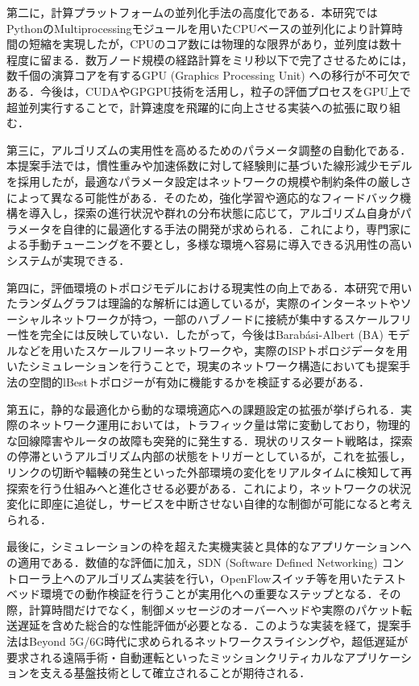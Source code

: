 第二に，計算プラットフォームの並列化手法の高度化である．本研究ではPythonのMultiprocessingモジュールを用いたCPUベースの並列化により計算時間の短縮を実現したが，CPUのコア数には物理的な限界があり，並列度は数十程度に留まる．数万ノード規模の経路計算をミリ秒以下で完了させるためには，数千個の演算コアを有するGPU (Graphics Processing Unit) への移行が不可欠である．今後は，CUDAやGPGPU技術を活用し，粒子の評価プロセスをGPU上で超並列実行することで，計算速度を飛躍的に向上させる実装への拡張に取り組む．

第三に，アルゴリズムの実用性を高めるためのパラメータ調整の自動化である．本提案手法では，慣性重みや加速係数に対して経験則に基づいた線形減少モデルを採用したが，最適なパラメータ設定はネットワークの規模や制約条件の厳しさによって異なる可能性がある．そのため，強化学習や適応的なフィードバック機構を導入し，探索の進行状況や群れの分布状態に応じて，アルゴリズム自身がパラメータを自律的に最適化する手法の開発が求められる．これにより，専門家による手動チューニングを不要とし，多様な環境へ容易に導入できる汎用性の高いシステムが実現できる．

第四に，評価環境のトポロジモデルにおける現実性の向上である．本研究で用いたランダムグラフは理論的な解析には適しているが，実際のインターネットやソーシャルネットワークが持つ，一部のハブノードに接続が集中するスケールフリー性を完全には反映していない．したがって，今後はBarabási-Albert (BA) モデルなどを用いたスケールフリーネットワークや，実際のISPトポロジデータを用いたシミュレーションを行うことで，現実のネットワーク構造においても提案手法の空間的lBestトポロジーが有効に機能するかを検証する必要がある．

第五に，静的な最適化から動的な環境適応への課題設定の拡張が挙げられる．実際のネットワーク運用においては，トラフィック量は常に変動しており，物理的な回線障害やルータの故障も突発的に発生する．現状のリスタート戦略は，探索の停滞というアルゴリズム内部の状態をトリガーとしているが，これを拡張し，リンクの切断や輻輳の発生といった外部環境の変化をリアルタイムに検知して再探索を行う仕組みへと進化させる必要がある．これにより，ネットワークの状況変化に即座に追従し，サービスを中断させない自律的な制御が可能になると考えられる．

最後に，シミュレーションの枠を超えた実機実装と具体的なアプリケーションへの適用である．数値的な評価に加え，SDN (Software Defined Networking) コントローラ上へのアルゴリズム実装を行い，OpenFlowスイッチ等を用いたテストベッド環境での動作検証を行うことが実用化への重要なステップとなる．その際，計算時間だけでなく，制御メッセージのオーバーヘッドや実際のパケット転送遅延を含めた総合的な性能評価が必要となる．このような実装を経て，提案手法はBeyond 5G/6G時代に求められるネットワークスライシングや，超低遅延が要求される遠隔手術・自動運転といったミッションクリティカルなアプリケーションを支える基盤技術として確立されることが期待される．